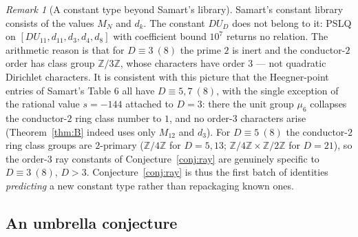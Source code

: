 \documentclass[11pt]{article}
\newcommand{\Zz}{\mathbb{Z}}
\theoremstyle{definition}
\theoremstyle{remark}
\newtheorem{remark}[theorem]{Remark}
\begin{document}
\begin{remark}[A constant type beyond Samart's library]
\label{rem:newconstant}
Samart's constant library consists of the values $M_N$ and $d_k$.
The constant $DU_D$ does not belong to it: PSLQ on
$[DU_{11},d_{11},d_3,d_4,d_8]$ with coefficient bound $10^7$
returns no relation. The arithmetic reason is that for
$D\equiv3\ (8)$ the prime $2$ is inert and the conductor-$2$ order
has class group $\Zz/3\Zz$, whose characters have order $3$ ---
not quadratic Dirichlet characters. It is consistent with this
picture that the Heegner-point entries of Samart's Table 6 all have
$D\equiv5,7\ (8)$, with the single exception of the rational value
$s=-144$ attached to $D=3$: there the unit group $\mu_6$ collapses
the conductor-$2$ ring class number to $1$, and no order-$3$
characters arise (Theorem~\ref{thm:B} indeed uses only $M_{12}$ and
$d_3$). For $D\equiv5\ (8)$ the conductor-$2$ ring class groups are
$2$-primary ($\Zz/4\Zz$ for $D=5,13$;
$\Zz/4\Zz\times\Zz/2\Zz$ for $D=21$), so the order-$3$ ray
constants of Conjecture~\ref{conj:ray} are genuinely specific to
$D\equiv3\ (8)$, $D>3$. Conjecture~\ref{conj:ray}
is thus the first batch of identities \emph{predicting} a new
constant type rather than repackaging known ones.
\end{remark}

\subsection{An umbrella conjecture}\label{subsec:umbrella}
\end{document}

